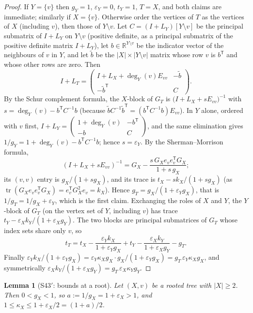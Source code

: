 \documentclass[11pt]{amsart}
\newtheorem{lemma}[theorem]{Lemma}
\theoremstyle{definition}
\theoremstyle{remark}
\newcommand{\tr}{\operatorname{tr}}
\begin{document}
\begin{proof}
If $Y=\{v\}$ then $g_Y=1$, $\varepsilon_Y=0$, $t_Y=1$, $T=X$, and both claims
are immediate; similarly if $X=\{v\}$. Otherwise order the vertices of $T$ as
the vertices of $X$ (including $v$), then those of $Y\setminus v$. Let
$C=(I+L_Y)[Y\setminus v]$ be the principal submatrix of $I+L_Y$ on
$Y\setminus v$ (positive definite, as a principal submatrix of the positive
definite matrix $I+L_Y$), let $b\in\mathbb R^{Y\setminus v}$ be the indicator
vector of the neighbours of $v$ in $Y$, and let $\tilde b$ be the
$|X|\times|Y\setminus v|$ matrix whose row $v$ is $b^{\mathsf T}$ and whose
other rows are zero. Then
\[
I+L_T=\begin{pmatrix}I+L_X+\deg_Y(v)E_{vv}&-\tilde b\\-\tilde b^{\mathsf T}&C\end{pmatrix}.
\]
By the Schur complement formula, the $X$-block of $G_T$ is
$\bigl(I+L_X+sE_{vv}\bigr)^{-1}$ with $s=\deg_Y(v)-b^{\mathsf T}C^{-1}b$
(because $\tilde bC^{-1}\tilde b^{\mathsf T}=(b^{\mathsf T}C^{-1}b)E_{vv}$).
In $Y$ alone, ordered with $v$ first,
$I+L_Y=\begin{pmatrix}1+\deg_Y(v)&-b^{\mathsf T}\\-b&C\end{pmatrix}$, and the
same elimination gives $1/g_Y=1+\deg_Y(v)-b^{\mathsf T}C^{-1}b$; hence
$s=\varepsilon_Y$. By the Sherman--Morrison formula,
\[
(I+L_X+sE_{vv})^{-1}=G_X-\frac{s\,G_Xe_ve_v^{\mathsf T}G_X}{1+s\,g_X};
\]
its $(v,v)$ entry is $g_X/(1+sg_X)$, and its trace is
$t_X-sk_X/(1+sg_X)$ (as $\tr(G_Xe_ve_v^{\mathsf T}G_X)=e_v^{\mathsf T}G_X^2e_v=k_X$).
Hence $g_T=g_X/(1+\varepsilon_Yg_X)$, that is $1/g_T=1/g_X+\varepsilon_Y$,
which is the first claim. Exchanging the roles of $X$ and $Y$, the
$Y$-block of $G_T$ (on the vertex set of $Y$, including $v$) has trace
$t_Y-\varepsilon_Xk_Y/(1+\varepsilon_Xg_Y)$. The two blocks are principal
submatrices of $G_T$ whose index sets share only $v$, so
\[
t_T=t_X-\frac{\varepsilon_Yk_X}{1+\varepsilon_Yg_X}+t_Y-\frac{\varepsilon_Xk_Y}{1+\varepsilon_Xg_Y}-g_T .
\]
Finally
$\varepsilon_Yk_X/(1+\varepsilon_Yg_X)=\varepsilon_Y\kappa_Xg_X\cdot g_X/(1+\varepsilon_Yg_X)=g_T\,\varepsilon_Y\kappa_Xg_X$,
and symmetrically $\varepsilon_Xk_Y/(1+\varepsilon_Xg_Y)=g_T\,\varepsilon_X\kappa_Yg_Y$.
\end{proof}

\begin{lemma}[S43$'$: bounds at a root]\label{lem:S43p}
Let $(X,v)$ be a rooted tree with $|X|\ge2$. Then $0<g_X<1$, so
$a:=1/g_X=1+\varepsilon_X>1$, and $1\le\kappa_X\le1+\varepsilon_X/2=(1+a)/2$.
\end{lemma}
\end{document}
